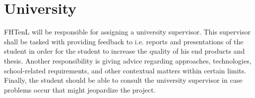 \section{University}
\gls{FHTenL} will be responsible for assigning a university supervisor. This supervisor shall be tasked with providing feedback to i.e. reports and presentations of the student in order for the student to increase the quality of his end products and thesis. Another responsibility is giving advice regarding approaches, technologies, school-related requirements, and other contextual matters within certain limits. Finally, the student should be able to consult the university supervisor in case problems occur that might jeopardize the project.
